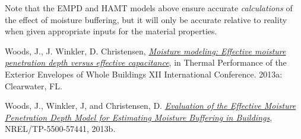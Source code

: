Note that the EMPD and HAMT models above ensure accurate \emph{calculations} of the effect of moisture buffering, but it will only be accurate relative to reality when given appropriate inputs for the material properties.

Woods, J., J. Winkler, D. Christensen, \href{http://www.techstreet.com/products/1868073}{\emph{Moisture modeling: Effective moisture penetration depth versus effective capacitance}}, in Thermal Performance of the Exterior Envelopes of Whole Buildings XII International Conference. 2013a: Clearwater, FL.

Woods, J., Winkler, J, and Christensen, D. \href{http://www.nrel.gov/docs/fy13osti/57441.pdf}{\emph{Evaluation of the Effective Moisture Penetration Depth Model for Estimating Moisture Buffering in Buildings}}, NREL/TP-5500-57441, 2013b.